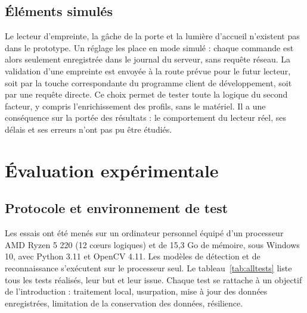 \subsection{Éléments simulés}

Le lecteur d'empreinte, la gâche de la porte et la lumière d'accueil n'existent pas dans le prototype. Un réglage les place en mode simulé : chaque commande est alors seulement enregistrée dans le journal du serveur, sans requête réseau. La validation d'une empreinte est envoyée à la route prévue pour le futur lecteur, soit par la touche correspondante du programme client de développement, soit par une requête directe. Ce choix permet de tester toute la logique du second facteur, y compris l'enrichissement des profils, sans le matériel. Il a une conséquence sur la portée des résultats : le comportement du lecteur réel, ses délais et ses erreurs n'ont pas pu être étudiés.

\section{Évaluation expérimentale}

\subsection{Protocole et environnement de test}

\begin{maj}
Les essais ont été menés sur un ordinateur personnel équipé d'un processeur AMD Ryzen 5 220 (12 cœurs logiques) et de 15,3 Go de mémoire, sous Windows 10, avec Python 3.11 et OpenCV 4.11. Les modèles de détection et de reconnaissance s'exécutent sur le processeur seul. Le tableau~\ref{tab:alltests} liste tous les tests réalisés, leur but et leur issue. Chaque test se rattache à un objectif de l'introduction : traitement local, usurpation, mise à jour des données enregistrées, limitation de la conservation des données, résilience.
\end{maj}

